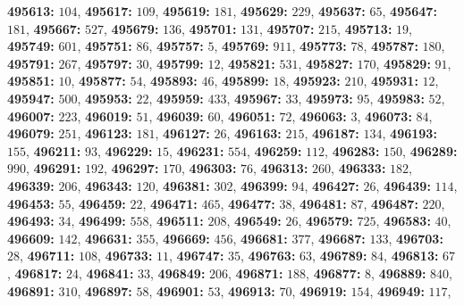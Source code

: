\textsf{\bfseries 495613:} $104$, \textsf{\bfseries 495617:} $109$, \textsf{\bfseries 495619:} $181$, \textsf{\bfseries 495629:} $229$, \textsf{\bfseries 495637:} $65$, \textsf{\bfseries 495647:} $181$, \textsf{\bfseries 495667:} $527$, \textsf{\bfseries 495679:} $136$, \textsf{\bfseries 495701:} $131$, \textsf{\bfseries 495707:} $215$, \textsf{\bfseries 495713:} $19$, \textsf{\bfseries 495749:} $601$, \textsf{\bfseries 495751:} $86$, \textsf{\bfseries 495757:} $5$, \textsf{\bfseries 495769:} $911$, \textsf{\bfseries 495773:} $78$, \textsf{\bfseries 495787:} $180$, \textsf{\bfseries 495791:} $267$, \textsf{\bfseries 495797:} $30$, \textsf{\bfseries 495799:} $12$, \textsf{\bfseries 495821:} $531$, \textsf{\bfseries 495827:} $170$, \textsf{\bfseries 495829:} $91$, \textsf{\bfseries 495851:} $10$, \textsf{\bfseries 495877:} $54$, \textsf{\bfseries 495893:} $46$, \textsf{\bfseries 495899:} $18$, \textsf{\bfseries 495923:} $210$, \textsf{\bfseries 495931:} $12$, \textsf{\bfseries 495947:} $500$, \textsf{\bfseries 495953:} $22$, \textsf{\bfseries 495959:} $433$, \textsf{\bfseries 495967:} $33$, \textsf{\bfseries 495973:} $95$, \textsf{\bfseries 495983:} $52$, \textsf{\bfseries 496007:} $223$, \textsf{\bfseries 496019:} $51$, \textsf{\bfseries 496039:} $60$, \textsf{\bfseries 496051:} $72$, \textsf{\bfseries 496063:} $3$, \textsf{\bfseries 496073:} $84$, \textsf{\bfseries 496079:} $251$, \textsf{\bfseries 496123:} $181$, \textsf{\bfseries 496127:} $26$, \textsf{\bfseries 496163:} $215$, \textsf{\bfseries 496187:} $134$, \textsf{\bfseries 496193:} $155$, \textsf{\bfseries 496211:} $93$, \textsf{\bfseries 496229:} $15$, \textsf{\bfseries 496231:} $554$, \textsf{\bfseries 496259:} $112$, \textsf{\bfseries 496283:} $150$, \textsf{\bfseries 496289:} $990$, \textsf{\bfseries 496291:} $192$, \textsf{\bfseries 496297:} $170$, \textsf{\bfseries 496303:} $76$, \textsf{\bfseries 496313:} $260$, \textsf{\bfseries 496333:} $182$, \textsf{\bfseries 496339:} $206$, \textsf{\bfseries 496343:} $120$, \textsf{\bfseries 496381:} $302$, \textsf{\bfseries 496399:} $94$, \textsf{\bfseries 496427:} $26$, \textsf{\bfseries 496439:} $114$, \textsf{\bfseries 496453:} $55$, \textsf{\bfseries 496459:} $22$, \textsf{\bfseries 496471:} $465$, \textsf{\bfseries 496477:} $38$, \textsf{\bfseries 496481:} $87$, \textsf{\bfseries 496487:} $220$, \textsf{\bfseries 496493:} $34$, \textsf{\bfseries 496499:} $558$, \textsf{\bfseries 496511:} $208$, \textsf{\bfseries 496549:} $26$, \textsf{\bfseries 496579:} $725$, \textsf{\bfseries 496583:} $40$, \textsf{\bfseries 496609:} $142$, \textsf{\bfseries 496631:} $355$, \textsf{\bfseries 496669:} $456$, \textsf{\bfseries 496681:} $377$, \textsf{\bfseries 496687:} $133$, \textsf{\bfseries 496703:} $28$, \textsf{\bfseries 496711:} $108$, \textsf{\bfseries 496733:} $11$, \textsf{\bfseries 496747:} $35$, \textsf{\bfseries 496763:} $63$, \textsf{\bfseries 496789:} $84$, \textsf{\bfseries 496813:} $67$, \textsf{\bfseries 496817:} $24$, \textsf{\bfseries 496841:} $33$, \textsf{\bfseries 496849:} $206$, \textsf{\bfseries 496871:} $188$, \textsf{\bfseries 496877:} $8$, \textsf{\bfseries 496889:} $840$, \textsf{\bfseries 496891:} $310$, \textsf{\bfseries 496897:} $58$, \textsf{\bfseries 496901:} $53$, \textsf{\bfseries 496913:} $70$, \textsf{\bfseries 496919:} $154$, \textsf{\bfseries 496949:} $117$, 
